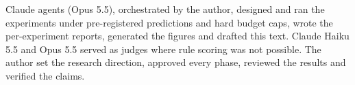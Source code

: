 
Claude agents (Opus 5.5), orchestrated by the author, designed and ran the experiments under
pre-registered predictions and hard budget caps, wrote the per-experiment reports, generated the
figures and drafted this text.
Claude Haiku 5.5 and Opus 5.5 served as judges where rule scoring was not possible.
The author set the research direction, approved every phase, reviewed the results and verified the
claims.
